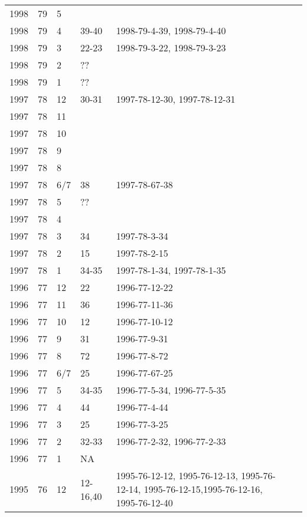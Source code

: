 \begin{longtable}{ |l|l|l|l|p{2.7cm}|l|p{2cm}| }
 1998 & 79 &     5 &         &  &  & \\
 1998 & 79 &     4 &   39-40 & 1998-79-4-39, 1998-79-4-40 &  & \\
 1998 & 79 &     3 &   22-23 & 1998-79-3-22, 1998-79-3-23 &  & \\
 1998 & 79 &     2 &     ??  &  &  & \\
 1998 & 79 &     1 &     ??  &  &  & \\
 1997 & 78 &    12 &    30-31   & 1997-78-12-30, 1997-78-12-31  &  & \\
 1997 & 78 &    11 &         &  &  & \\
 1997 & 78 &    10 &         &  &  & \\
 1997 & 78 &     9 &         &  &  & \\
 1997 & 78 &     8 &         &  &  & \\
 1997 & 78 &   6/7 &    38   & 1997-78-67-38  &  & \\
 1997 & 78 &     5 &     ??  &  &  & \\
 1997 & 78 &     4 &         &  &  & \\
 1997 & 78 &     3 &    34   & 1997-78-3-34 &  & \\
 1997 & 78 &     2 &    15   & 1997-78-2-15  &  & \\
 1997 & 78 &     1 &   34-35 & 1997-78-1-34, 1997-78-1-35 &  & \\
 1996 & 77 &    12 &    22   & 1996-77-12-22 &  & \\
 1996 & 77 &    11 &    36   & 1996-77-11-36 &  & \\
 1996 & 77 &    10 &    12   &  1996-77-10-12 &  & \\
 1996 & 77 &     9 &    31   & 1996-77-9-31   &  & \\
 1996 & 77 &     8 &    72   & 1996-77-8-72   &  & \\
 1996 & 77 &   6/7 &  25     & 1996-77-67-25  &  & \\
 1996 & 77 &     5 & 34-35   & 1996-77-5-34, 1996-77-5-35 &  & \\
 1996 & 77 &     4 &  44     & 1996-77-4-44   &  & \\
 1996 & 77 &     3 &  25     & 1996-77-3-25   &  & \\
 1996 & 77 &     2 &  32-33  & 1996-77-2-32, 1996-77-2-33 &  & \\
 1996 & 77 &     1 &     NA  &                &  & \\
 1995 & 76 &    12 &12-16,40 & 1995-76-12-12, 1995-76-12-13, 1995-76-12-14, 1995-76-12-15,1995-76-12-16, 1995-76-12-40 &  & \\

\end{longtable}

